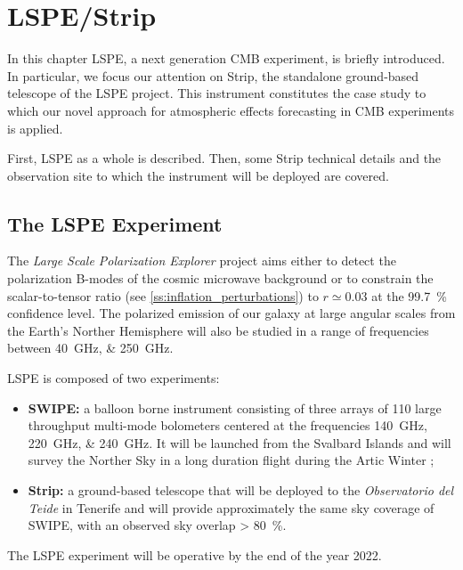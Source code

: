\chapter{LSPE/Strip}\label{ch:lspe_strip}

In this chapter LSPE, a next generation CMB experiment, is briefly
introduced. In particular, we focus our attention on Strip, the standalone
ground-based telescope of the LSPE project. This instrument constitutes the
case study to which our novel approach for atmospheric effects forecasting
in CMB experiments is applied.

First, LSPE as a whole is described. Then, some Strip technical details and
the observation site to which the instrument will be deployed are covered.

\section{The LSPE Experiment}

The \emph{Large Scale Polarization Explorer}
\autocite{aiola2012large}\autocite{addamo2020large} project aims either to
detect the polarization B-modes of the cosmic microwave background or to
constrain the scalar-to-tensor ratio (see
\autoref{ss:inflation_perturbations}) to $r \simeq 0.03$ at the
\SI{99.7}{\percent} confidence level. The polarized emission of our galaxy
at large angular scales from the Earth's Norther Hemisphere will also be
studied in a range of frequencies between \SIlist{40;250}{\giga\hertz}.

LSPE is composed of two experiments:

\begin{itemize}
        \item \textbf{SWIPE:} a balloon borne instrument consisting of
        three arrays of \num{110} large throughput multi-mode bolometers
        centered at the frequencies \SIlist{140;220;240}{\giga\hertz}. It
        will be launched from the Svalbard Islands and will survey the
        Norther Sky in a long duration flight during the Artic Winter
        \autocite{de2012swipe};

        \item \textbf{Strip:} a ground-based telescope that will be
        deployed to the \emph{Observatorio del Teide} in Tenerife and will
        provide approximately the same sky coverage of SWIPE, with an
        observed sky overlap \SI{> 80}{\percent}.
\end{itemize}

The LSPE experiment will be operative by the end of the year 2022.

